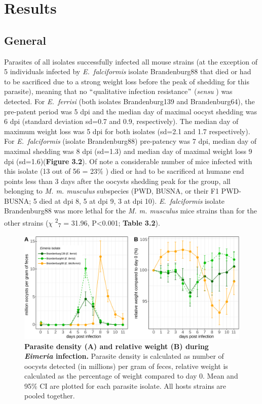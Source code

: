 \section{Results}

\subsection{General}

Parasites of all isolates successfully infected all mouse strains (at the exception of 5 individuals infected by \textit{E.~falciformis} isolate Brandenburg88 that died or had to be sacrificed due to a strong weight loss before the peak of shedding for this parasite), meaning that no $``$qualitative infection resistance$"$  (\textit{sensu} \cite{Gandon2000}) was detected. For \textit{E.~ferrisi }(both isolates Brandenburg139 and Brandenburg64), the pre-patent period was 5 dpi and the median day of maximal oocyst shedding was 6 dpi (standard deviation sd=0.7 and 0.9, respectively). The median day of maximum weight loss was 5 dpi for both isolates (sd=2.1 and 1.7 respectively). For \textit{E.~falciformis} (isolate Brandenburg88) pre-patency was 7 dpi, median day of maximal shedding was 8 dpi (sd=1.3) and median day of maximal weight loss 9 dpi (sd=1.6)(\textbf{Figure 3.2}). Of note a considerable number of mice infected with this isolate (13 out of 56 = 23$\%$ ) died or had to be sacrificed at humane end points less than 3 days after the oocysts shedding peak for the group, all belonging to \textit{M. m. musculus} subspecies (PWD, BUSNA, or their F1 PWD-BUSNA; 5 died at dpi 8, 5 at dpi 9, 3 at dpi 10). \textit{E.~falciformis }isolate Brandenburg88 was more lethal for the \textit{M. m. musculus} mice strains than for the other strains ($ \chi $ \textsuperscript{2}\textsubscript{7 }= 31.96, P<0.001; \textbf{Table 3.2}).\par

\begin{figure}[H]
    \centering
    \includegraphics[width=\linewidth,height=\textheight,keepaspectratio]{images/3article2/Fig2_final.pdf}
    \caption{\textbf{Parasite density (A) and relative weight (B) during \textit{Eimeria} infection.} Parasite density is calculated as number of oocysts detected (in millions) per gram of feces, relative weight is calculated as the percentage of weight compared to day 0. Mean and 95\% CI are plotted for each parasite isolate. All hosts strains are pooled together.}
\end{figure}


